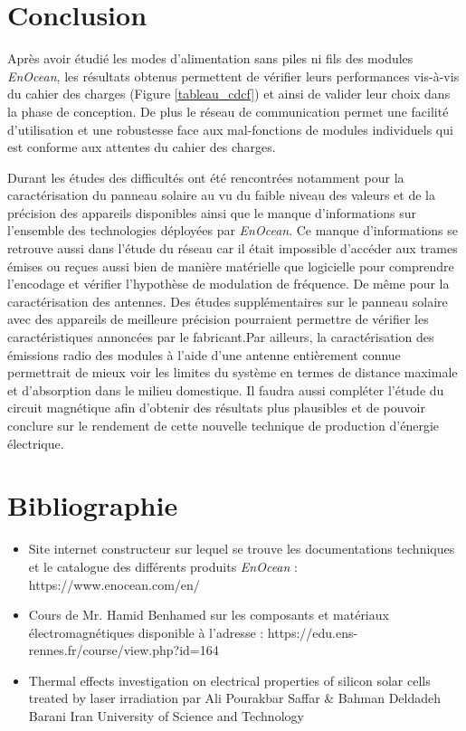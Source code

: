 \documentclass{rapportENS}
\begin{document}
\part{Conclusion}

Après avoir étudié les modes d'alimentation sans piles ni fils des modules \textit{EnOcean}, les résultats obtenus permettent de vérifier leurs performances vis-à-vis du cahier des charges (Figure \ref{tableau_cdcf}) et ainsi de valider leur choix dans la phase de conception. De plus le réseau de communication permet une facilité d'utilisation et une robustesse face aux mal-fonctions de modules individuels qui est conforme aux attentes du cahier des charges.

Durant les études des difficultés ont été rencontrées notamment pour la caractérisation du panneau solaire au vu du faible niveau des valeurs et de la précision des appareils disponibles ainsi que le manque d'informations sur l'ensemble des technologies déployées par \textit{EnOcean}. Ce manque d'informations se retrouve aussi dans l'étude du réseau car il était impossible d'accéder aux trames émises ou reçues aussi bien de manière matérielle que logicielle pour comprendre l'encodage et vérifier l'hypothèse de modulation de fréquence. De même pour la caractérisation des antennes. Des études supplémentaires sur le panneau solaire avec des appareils de meilleure précision pourraient permettre de vérifier les caractéristiques annoncées par le fabricant.Par ailleurs, la caractérisation des émissions radio des modules à l'aide d'une antenne entièrement connue permettrait de mieux voir les limites du système en termes de distance maximale et d'absorption dans le milieu domestique. Il faudra aussi compléter l'étude du circuit magnétique afin d'obtenir des résultats plus plausibles et de pouvoir conclure sur le rendement de cette nouvelle technique de production d'énergie électrique. 

\part{Bibliographie}

\begin{itemize}
    \item Site internet constructeur sur lequel se trouve les documentations techniques et le catalogue des différents produits \textit{EnOcean} : https://www.enocean.com/en/
    \item Cours de Mr. Hamid Benhamed sur les composants et matériaux électromagnétiques disponible à l'adresse : https://edu.ens-rennes.fr/course/view.php?id=164
    \item Thermal effects investigation on electrical properties of silicon solar cells treated by laser irradiation  par Ali Pourakbar Saffar \& Bahman Deldadeh Barani Iran University of Science and Technology
\end{itemize}
\end{document}
